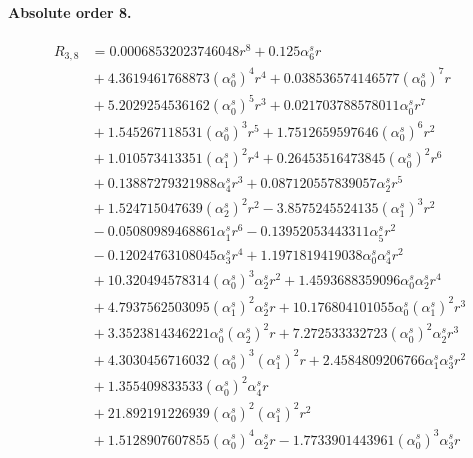 \documentclass[10pt]{article}
\begin{document}
\paragraph{Absolute order 8.}
\begin{align*}
R_{3,8} &= 0.00068532023746048 r^{8} + 0.125 \alpha_{6}^s r \\
&{}  + 4.3619461768873 \left(\alpha_{0}^s\right)^{4} r^{4} + 0.038536574146577 \left(\alpha_{0}^s\right)^{7} r \\
&{}  + 5.2029254536162 \left(\alpha_{0}^s\right)^{5} r^{3} + 0.021703788578011 \alpha_{0}^s r^{7} \\
&{}  + 1.545267118531 \left(\alpha_{0}^s\right)^{3} r^{5} + 1.7512659597646 \left(\alpha_{0}^s\right)^{6} r^{2} \\
&{}  + 1.010573413351 \left(\alpha_{1}^s\right)^{2} r^{4} + 0.26453516473845 \left(\alpha_{0}^s\right)^{2} r^{6} \\
&{}  + 0.13887279321988 \alpha_{4}^s r^{3} + 0.087120557839057 \alpha_{2}^s r^{5} \\
&{}  + 1.524715047639 \left(\alpha_{2}^s\right)^{2} r^{2} - 3.8575245524135 \left(\alpha_{1}^s\right)^{3} r^{2} \\
&{}  - 0.05080989468861 \alpha_{1}^s r^{6} - 0.13952053443311 \alpha_{5}^s r^{2} \\
&{}  - 0.12024763108045 \alpha_{3}^s r^{4} + 1.1971819419038 \alpha_{0}^s \alpha_{4}^s r^{2} \\
&{}  + 10.320494578314 \left(\alpha_{0}^s\right)^{3} \alpha_{2}^s r^{2} + 1.4593688359096 \alpha_{0}^s \alpha_{2}^s r^{4} \\
&{}  + 4.7937562503095 \left(\alpha_{1}^s\right)^{2} \alpha_{2}^s r + 10.176804101055 \alpha_{0}^s \left(\alpha_{1}^s\right)^{2} r^{3} \\
&{}  + 3.3523814346221 \alpha_{0}^s \left(\alpha_{2}^s\right)^{2} r + 7.272533332723 \left(\alpha_{0}^s\right)^{2} \alpha_{2}^s r^{3} \\
&{}  + 4.3030456716032 \left(\alpha_{0}^s\right)^{3} \left(\alpha_{1}^s\right)^{2} r + 2.4584809206766 \alpha_{1}^s \alpha_{3}^s r^{2} \\
&{}  + 1.355409833533 \left(\alpha_{0}^s\right)^{2} \alpha_{4}^s r \\
&{}  + 21.892191226939 \left(\alpha_{0}^s\right)^{2} \left(\alpha_{1}^s\right)^{2} r^{2} \\
&{}  + 1.5128907607855 \left(\alpha_{0}^s\right)^{4} \alpha_{2}^s r - 1.7733901443961 \left(\alpha_{0}^s\right)^{3} \alpha_{3}^s r \\

\end{align*}
\end{document}
